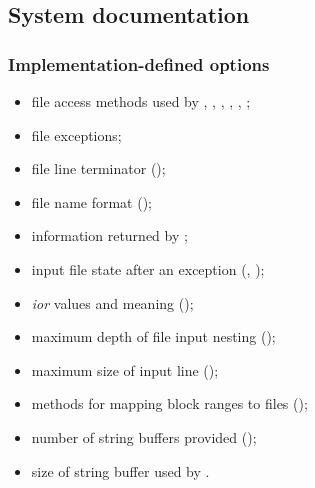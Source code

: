 \subsection{System documentation} %

\subsubsection{Implementation-defined options} %
\label{file:impopt}

\begin{itemize}
\item file access methods used by
	,
	,
	,
	,
	, 
	;
\item file exceptions;
\item file line terminator ();
\item file name format ();
\item information returned by ;
\item input file state after an exception
	(,
	 );
\item \emph{ior} values and meaning ();
\item maximum depth of file input nesting
	();
\item maximum size of input line ();
\item methods for mapping block ranges to files
	();
\item number of string buffers provided ();
\item size of string buffer used by .
\end{itemize}

